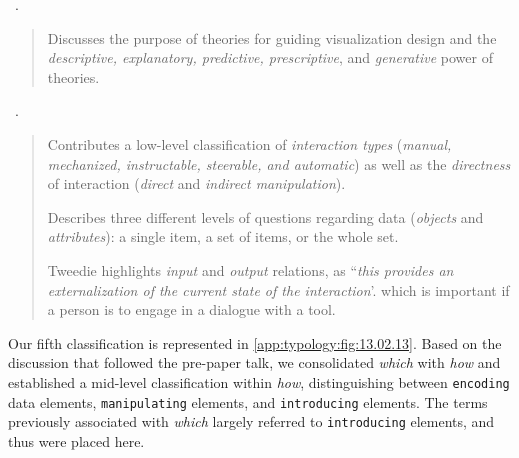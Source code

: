 \begin{sloppypar}
~\cite{Bederson2003}. \end{sloppypar}

\begin{quotation}
    Discusses the purpose of theories for guiding visualization design and the {\it descriptive, explanatory, predictive, prescriptive}, and {\it generative} power of theories.
\end{quotation}

\begin{sloppypar}
~\cite{Tweedie1997}. \end{sloppypar}

\begin{quotation}
    \begin{sloppypar}
    Contributes a low-level classification of {\it interaction types} ({\it manual, mechanized, instructable, steerable, and automatic}) as well as the {\it directness} of interaction ({\it direct} and {\it indirect manipulation}).
    \end{sloppypar}
    
    Describes three different levels of questions regarding data ({\it objects} and {\it attributes}): a single item, a set of items, or the whole set.
    
    Tweedie highlights {\it input} and {\it output} relations, as ``{\it this provides an externalization of the current state of the interaction}'. which is important if a person is to engage in a dialogue with a tool.
\end{quotation}

Our fifth classification is represented in \autoref{app:typology:fig:13.02.13}.
Based on the discussion that followed the pre-paper talk, we consolidated {\it which} with {\it how} and established a mid-level classification within {\it how}, distinguishing between {\tt encoding} data elements, {\tt manipulating} elements, and {\tt introducing} elements.
The terms previously associated with {\it which} largely referred to {\tt introducing} elements, and thus were placed here.


